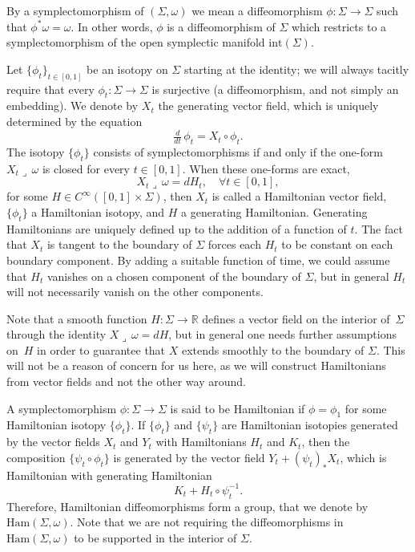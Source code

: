 \documentclass[JEP,XML,SOM,Unicode,published]{cedram}
\let\mathds\mathbb
\theoremstyle{definition}
\newcommand{\Ham}{\mathrm{Ham}}
\newcommand{\R}{\mathds{R}}
\begin{document}
By a symplectomorphism of $(\Sigma,\omega)$ we mean a diffeomorphism $\phi: \Sigma \to \Sigma$ such that $\phi^* \omega = \omega$. In other words, $\phi$ is a diffeomorphism of $\Sigma$ which restricts to a symplectomorphism of the open symplectic manifold $\mathrm{int}(\Sigma)$.

Let $\{\phi_t\}_{t\in [0,1]}$ be an isotopy on $\Sigma$ starting at the identity; we will always tacitly require that every $\phi_t:\Sigma\to\Sigma$ is surjective (\ie a diffeomorphism, and not simply an embedding). We denote by $X_t$ the generating vector field, which is uniquely determined by the equation
\[
\tfrac{d}{dt}\, \phi_t = X_t\circ\phi_t.
\]
The isotopy $\{\phi_t\}$ consists of symplectomorphisms if and only if the one-form $X_t \lrcorner \,\omega$ is closed for every $t\in [0,1]$. When these one-forms are exact, \ie
\[
X_t \lrcorner \,\omega = dH_t, \quad \forall t\in [0,1],
\]
for some $H\in C^{\infty}([0,1]\times \Sigma)$, then $X_t$ is called a Hamiltonian vector field, $\{\phi_t\}$ a Hamiltonian isotopy, and $H$ a generating Hamiltonian. Generating Hamiltonians are uniquely defined up to the addition of a function of $t$. The fact that $X_t$ is tangent to the boundary of $\Sigma$ forces each $H_t$ to be constant on each boundary component. By adding a suitable function of time, we could assume that $H_t$ vanishes on a chosen component of the boundary of $\Sigma$, but in general $H_t$ will not necessarily vanish on the other components.

Note that a smooth function $H:\Sigma\to\R$ defines a vector field on the interior of~$\Sigma$ through the identity $X \lrcorner \,\omega = dH$, but in general one needs further assumptions on~$H$ in order to guarantee that $X$ extends smoothly to the boundary of $\Sigma$. This will not be a reason of concern for us here, as we will construct Hamiltonians from vector fields and not the other way around.

A symplectomorphism $\phi: \Sigma \to \Sigma$ is said to be Hamiltonian if $\phi=\phi_1$ for some Hamiltonian isotopy $\{\phi_t\}$. If $\{\phi_t\}$ and $\{\psi_t\}$ are Hamiltonian isotopies generated by the vector fields $X_t$ and $Y_t$ with Hamiltonians $H_t$ and $K_t$, then the composition $\{\psi_t \circ \phi_t\}$ is generated by the vector field $Y_t + (\psi_t)_* X_t$, which is Hamiltonian with generating Hamiltonian
\begin{equation}
\label{hamprod}
K_t + H_t \circ \psi_t^{-1}.
\end{equation}
Therefore, Hamiltonian diffeomorphisms form a group, that we denote by~$\Ham(\Sigma,\omega)$. Note that we are not requiring the diffeomorphisms in $\Ham(\Sigma,\omega)$ to be supported in the interior of $\Sigma$.
\end{document}
